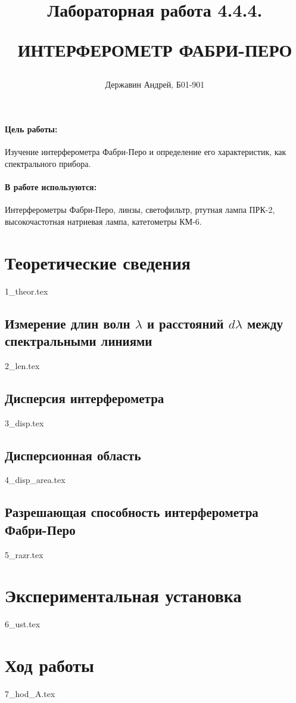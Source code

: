\documentclass[a5paper,10pt, twoside]{article} %
\title
{
\hfill \break	\hfill \break
\hfill \break	\hfill \break
Лабораторная работа 4.4.4.

ИНТЕРФЕРОМЕТР ФАБРИ-ПЕРО
}
\author{Державин Андрей, Б01-901}
\begin{document}
\maketitle


\thispagestyle{empty} %

\newpage

\tableofcontents %
\thispagestyle{plain}
\newpage


\paragraph{Цель работы:}

Изучение интерферометра Фабри-Перо и определение его характеристик, как спектрального прибора.

\paragraph{В работе используются:}

Интерферометры Фабри-Перо, линзы, светофильтр, ртутная лампа ПРК-2, высокочастотная натриевая лампа,
катетометры КМ-6.

\section{Теоретические сведения}
{1_theor.tex}

  \subsection{Измерение длин волн $\lambda$ и расстояний $d \lambda$ между спектральными линиями}
  {2_len.tex}

  \subsection{Дисперсия интерферометра}
  {3_disp.tex}

  \subsection{Дисперсионная область}
  {4_disp_area.tex}

  \subsection{Разрешающая способность интерферометра Фабри-Перо}
  {5_razr.tex}

\section{Экспериментальная установка}
{6_ust.tex}

\newpage 
\section{Ход работы}
{7_hod_A.tex}
\end{document}
